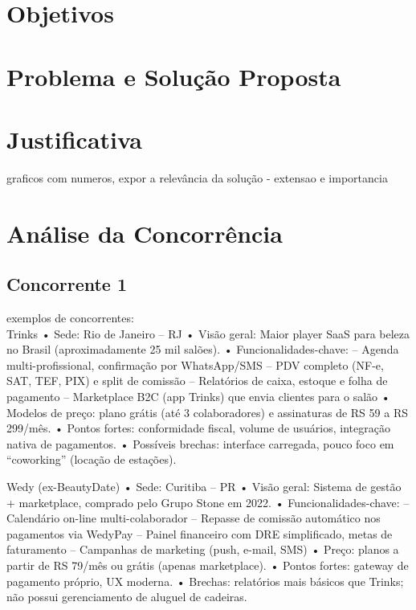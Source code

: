 
\section{Objetivos}
\section{Problema e Solução Proposta}
\section{Justificativa}
graficos com numeros, expor a relevância da solução - extensao e importancia
\section{Análise da Concorrência}

\subsection{Concorrente 1}
 exemplos de concorrentes:\\
 
 Trinks
 • Sede: Rio de Janeiro – RJ
 • Visão geral: Maior player SaaS para beleza no Brasil (aproximadamente 25 mil salões).
 • Funcionalidades-chave:
 – Agenda multi-profissional, confirmação por WhatsApp/SMS
 – PDV completo (NF-e, SAT, TEF, PIX) e split de comissão
 – Relatórios de caixa, estoque e folha de pagamento
 – Marketplace B2C (app Trinks) que envia clientes para o salão
 • Modelos de preço: plano grátis (até 3 colaboradores) e assinaturas de RS 59 a RS 299/mês.
 • Pontos fortes: conformidade fiscal, volume de usuários, integração nativa de pagamentos.
 • Possíveis brechas: interface carregada, pouco foco em “coworking” (locação de estações).
 
 Wedy (ex-BeautyDate)
 • Sede: Curitiba – PR
 • Visão geral: Sistema de gestão + marketplace, comprado pelo Grupo Stone em 2022.
 • Funcionalidades-chave:
 – Calendário on-line multi-colaborador
 – Repasse de comissão automático nos pagamentos via WedyPay
 – Painel financeiro com DRE simplificado, metas de faturamento
 – Campanhas de marketing (push, e-mail, SMS)
 • Preço: planos a partir de RS 79/mês ou grátis (apenas marketplace).
 • Pontos fortes: gateway de pagamento próprio, UX moderna.
 • Brechas: relatórios mais básicos que Trinks; não possui gerenciamento de aluguel de cadeiras.
 
